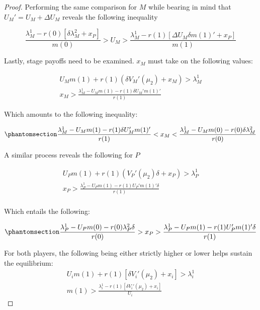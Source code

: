 \documentclass[
  12pt,
]{article}
\theoremstyle{plain}
\theoremstyle{plain}
\theoremstyle{remark}
\begin{document}
\begin{proof}
Performing the same comparison for \(M\) while bearing in mind that
\(U_M' = U_M + \Delta U_M\) reveals the following inequality

\[
\frac{\lambda^1_M - r(0)[\delta \lambda^2_M + x_P]}{m(0)} > U_M > \frac{\lambda^1_M- r(1)[\Delta U_M \delta m(1)'  + x_P]}{m(1)}
\]

Lastly, stage payoffs need to be examined. \(x_M\) must take on the
following values:

\[
\begin{aligned}
U_M m(1) + r(1)(\delta V_M'(\mu_2) + x_M) > \lambda^1_M\\
x_M > \frac{\lambda^1_M-U_M m(1) - r(1)\delta U_M'm(1)' }{r(1)}
\end{aligned}
\]

Which amounts to the following inequality:

\begin{equation}\phantomsection\label{eq-stage_sep_m}{
\begin{aligned}
\frac{\lambda^1_M -U_M m(1) - r(1)\delta U_M'm(1)' }{r(1)}<x_M < \frac{\lambda^1_M-U_M m(0) - r(0)\delta\lambda^2_M}{r(0)}
\end{aligned}
}\end{equation}

A similar process reveals the following for \(P\)

\[
\begin{aligned}
U_P m(1) + r(1)(V_P'(\mu_2)\delta + x_P) > \lambda^1_P\\
x_P > \frac{\lambda^1_P - U_P m(1) - r(1)U_P' m(1)' \delta}{r(1)} \\
\end{aligned}
\]

Which entails the following:

\begin{equation}\phantomsection\label{eq-stage_sep_p}{
\begin{aligned}
\frac{\lambda^1_P - U_P m(0) - r(0) \lambda^2_P \delta}{r(0)} > x_P > \frac{\lambda^1_P - U_P m(1) - r(1)U_P' m(1)' \delta}{r(1)}\\
\end{aligned}
}\end{equation}

For both players, the following being either strictly higher or lower
helps sustain the equilibrium: \[
\begin{aligned}
U_i m(1) + r(1)[ \delta V_i'(\mu_2) + x_i] > \lambda^1_i\\
m(1) > \frac{\lambda^1_i -r(1)[\delta V_i'(\mu_2) + x_i ]}{U_i}
\end{aligned}
\]


\end{proof}
\end{document}
